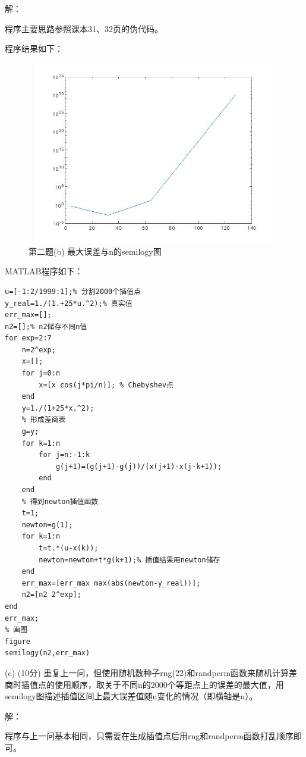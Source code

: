 \documentclass[12pt,a4paper,utf8]{ctexart}
\begin{document}
\begin{enumerate}
解：

程序主要思路参照课本31、32页的伪代码。

程序结果如下：
\begin{figure}[htbp]
   \centering
   \includegraphics[width=15cm,height=8cm]{ex2b.jpg}
   \caption{第二题(b) 最大误差与n的semilogy图}
\end{figure}

MATLAB程序如下：
\begin{lstlisting}[frame=single]
u=[-1:2/1999:1];% 分割2000个插值点
y_real=1./(1.+25*u.^2);% 真实值
err_max=[];
n2=[];% n2储存不同n值
for exp=2:7
    n=2^exp;
    x=[];
    for j=0:n
        x=[x cos(j*pi/n)]; % Chebyshev点
    end
    y=1./(1+25*x.^2);
    % 形成差商表
    g=y;
    for k=1:n
        for j=n:-1:k
            g(j+1)=(g(j+1)-g(j))/(x(j+1)-x(j-k+1));
        end
    end
    % 得到newton插值函数
    t=1;
    newton=g(1);
    for k=1:n
        t=t.*(u-x(k));
        newton=newton+t*g(k+1);% 插值结果用newton储存
    end
    err_max=[err_max max(abs(newton-y_real))];
    n2=[n2 2^exp];
end
err_max;
% 画图
figure
semilogy(n2,err_max)
\end{lstlisting}

(c) (10分) 重复上一问，但使用随机数种子rng(22)和randperm函数来随机计算差商时插值点的使用顺序，取关于不同n的2000个等距点上的误差的最大值，用semilogy图描述插值区间上最大误差值随n变化的情况（即横轴是n）。

解：

程序与上一问基本相同，只需要在生成插值点后用rng和randperm函数打乱顺序即可。


\end{enumerate}
\end{document}
